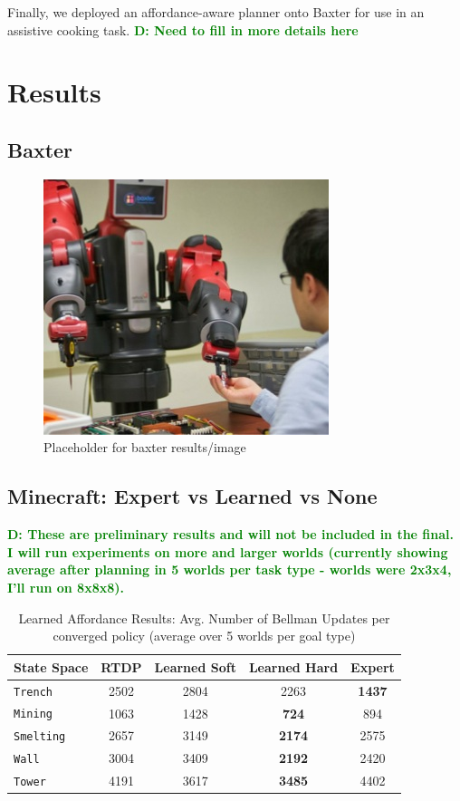 \documentclass[conference]{IEEEtran}
\newcommand{\dnote}[1]{\textcolor{Green}{\textbf{D: #1}}}
\begin{document}
Finally, we deployed an affordance-aware planner onto Baxter for use in an assistive cooking task. \dnote{Need to fill in more details here}

\section{Results}
\label{sec:results}

\subsection{Baxter}

\begin{figure}[H]
\centering
\includegraphics[scale=0.195]{figures/baxter_temp.jpg}%
  \caption{Placeholder for baxter results/image}
  \label{fig:baxter_results}
\end{figure}

\subsection{Minecraft: Expert vs Learned vs None}



\dnote{These are preliminary results and will not be included in the final. I will run experiments on more and larger worlds (currently showing average after planning in 5 worlds per task type - worlds were 2x3x4, I'll run on 8x8x8).}

\begin{table}[H]
\centering
\begin{tabular}{ l || c c c c }
  State Space & RTDP & Learned Soft & Learned Hard & Expert 	 	\\ \hline
  \texttt{Trench}  	& 	2502	&	2804		&	2263	&	{\bf 1437}	\\
  \texttt{Mining}  	& 	1063	&	1428		&	{\bf 724}	&	894  \\
  \texttt{Smelting}  	& 	2657	&	3149		&	{\bf 2174}	&	2575  \\
  \texttt{Wall}  		& 	3004	&	3409		&	{\bf 2192}	&	2420\\
  \texttt{Tower}  		& 	4191	&	3617		&	{\bf 3485}	&	4402 \\
\end{tabular}
\caption{Learned Affordance Results: Avg. Number of Bellman Updates per converged policy (average over 5 worlds per goal type)}
\label{table:minecraft_results_bellman}
\end{table}
\end{document}
